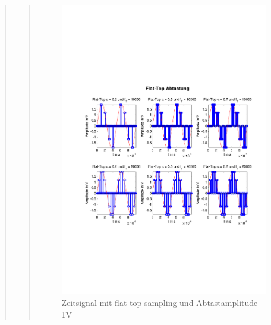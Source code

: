 \begin{quote}
\begin{quote}
  	    \begin{figure}[H]
    \centering
        \includegraphics[scale=0.6, trim = 1.5cm 6cm 1cm 8cm,
        clip]{./Bilder/flat-top-zeit_1V}
            \caption{Zeitsignal mit flat-top-sampling und Abtastamplitude 1V}
  	    \end{figure}
  	    

\end{quote}
\end{quote}
